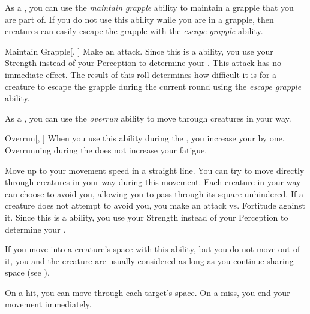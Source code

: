         \label{Maintain Grapple} As a , you can use the \textit{maintain grapple} ability to maintain a grapple that you are part of.
        If you do not use this ability while you are in a grapple, then creatures can easily escape the grapple with the \textit{escape grapple} ability.
        \begin{activeability}{Maintain Grapple}[, ]
            \rankline
            Make an attack.
            Since this is a  ability, you use your Strength instead of your Perception to determine your .
            This attack has no immediate effect.
            The result of this roll determines how difficult it is for a creature to escape the grapple during the current round using the \textit{escape grapple} ability.
        \end{activeability}

        \label{Overrun} As a , you can use the \textit{overrun} ability to move through creatures in your way.

        \begin{activeability}{Overrun}[, ]
            \rankline
            When you use this ability during the , you increase your  by one.
            Overrunning during the  does not increase your fatigue.

            Move up to your movement speed in a straight line.
            You can try to move directly through creatures in your way during this movement.
            Each creature in your way can choose to avoid you, allowing you to pass through its square unhindered.
            If a creature does not attempt to avoid you, you make an attack vs. Fortitude against it.
            Since this is a  ability, you use your Strength instead of your Perception to determine your .

            If you move into a creature's space with this ability, but you do not move out of it, you and the creature are usually considered \squeezing as long as you continue sharing space (see ).

            On a hit, you can move through each target's space.
            On a miss, you end your movement immediately.
        \end{activeability}

